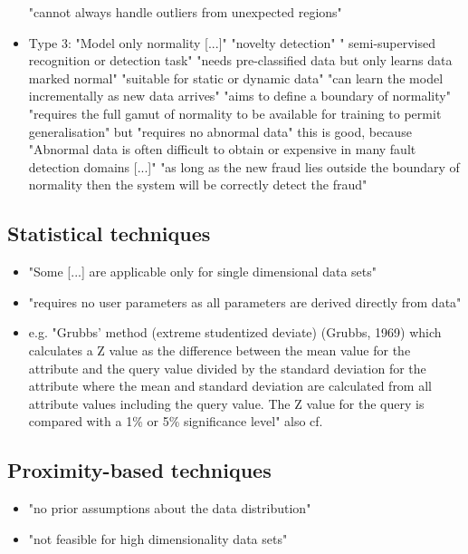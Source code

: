 \begin{itemize}
			\subitem "cannot always handle outliers from unexpected regions" \parencite{Hodge2004}
		\item Type 3: "Model only normality [...]" \parencite{Hodge2004}
			\subitem "novelty detection" \parencite{Hodge2004} " semi-supervised recognition or detection task" \parencite{Hodge2004}
			\subitem "needs pre-classified data but only learns data marked normal" \parencite{Hodge2004}
			\subitem "suitable for static or dynamic data" \parencite{Hodge2004}
			\subitem "can learn the model incrementally as new data arrives" \parencite{Hodge2004}
			\subitem "aims to define a boundary of normality" \parencite{Hodge2004}
			\subitem "requires the full gamut of normality to be available for training to permit generalisation" \parencite{Hodge2004} but "requires no abnormal data" \parencite{Hodge2004}
			\subitem this is good, because "Abnormal data is often difficult to obtain or expensive in many fault detection domains [...]" \parencite{Hodge2004}
			\subitem "as long as the new fraud lies outside the boundary of normality then the system will be correctly detect the fraud" \parencite{Hodge2004}
		
	\end{itemize}

	\subsection{Statistical techniques}
	\begin{itemize}
		\item "Some [...] are applicable only for single dimensional data sets" \parencite{Hodge2004}
		\item "requires no user parameters as all parameters are derived directly from data" \parencite{Hodge2004}
		\item e.g. "Grubbs’ method (extreme studentized deviate) (Grubbs, 1969) which calculates a Z value as the difference between the mean value for the attribute and the query value divided by the standard deviation for the attribute where the mean and standard deviation are calculated from all attribute values including the query value. The Z value for the query is compared with a 1\% or 5\% significance level" \parencite{Hodge2004} also cf. \textcite{Grubbs1969}
	\end{itemize}
	
	\subsection{Proximity-based techniques}
	\begin{itemize}
		\item "no prior assumptions about the data distribution" \parencite{Hodge2004}
		\item "not feasible for high dimensionality data sets" \parencite{Hodge2004}
		
	\end{itemize}
	
